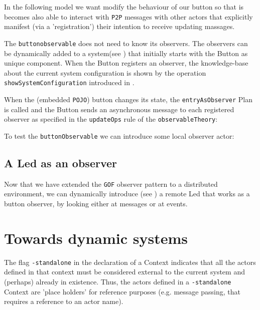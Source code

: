In the following model we want modify the behaviour of our button so that is becomes also able to interact with \texttt{P2P} messages with other actors that explicitly manifest (via a 'registration') their intention to receive updating massages.



The \texttt{buttonobservable} does not need to know its observers. The observers can be dynamically added to a system(see ) that initially starts with the Button as unique component. When the Button registers an observer,  the knowledge-base about the current system configuration is shown by the operation \texttt{showSystemConfiguration} introduced in .

When the (embedded \texttt{POJO}) button changes its state, the \texttt{entryAsObserver} Plan is called and the Button sends an asynchronous  message to each registered observer as specified in the   \texttt{updateOps} rule of the \texttt{observableTheory}:



 
To test the \texttt{buttonObservable} we can introduce some local observer actor:




\subsection{A Led as an observer}

Now that we have extended the \texttt{GOF} observer pattern to a distributed environment, we can dynamically introduce (see ) a remote Led that works as a button observer, by looking either at  messages or at  events.



\newpage 
\section{Towards dynamic systems}
The flag \texttt{-standalone} in the declaration of a Context indicates that all the actors defined in that context must be considered external to the current system and (perhaps) already in existence. Thus, the  actors defined in a \texttt{-standalone} Context are 'place holders' for reference purposes (e.g. message passing, that requires a reference to an actor name).

